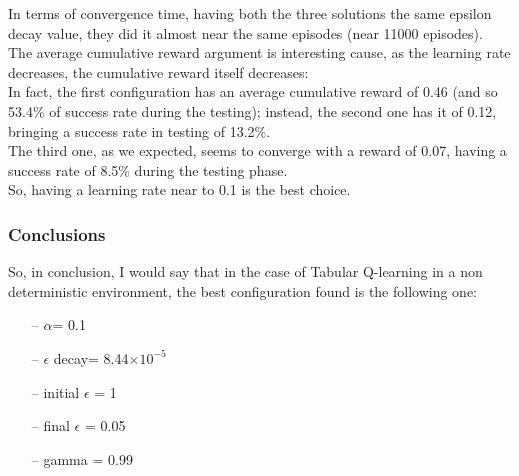 \documentclass{article}
\begin{document}
\begin{center}
\centering
{}
\end{center}

\clearpage

In terms of convergence time, having both the three solutions the same epsilon decay value, they did it almost near the same episodes (near 11000 episodes).
\\
The average cumulative reward argument is interesting cause, as the learning rate decreases, the cumulative reward itself decreases:
\\
In fact, the first configuration has an average cumulative reward of 0.46 (and so 53.4\% of success rate during the testing); instead, the second one has it of 0.12, bringing a success rate in testing of 13.2\%.
\\
The third one, as we expected, seems to converge with a reward of 0.07, having a success rate of 8.5\% during the testing phase.
\\
So, having a learning rate near to 0.1 is the best choice. 


\subsubsection{Conclusions}

So, in conclusion, I would say that in the case of Tabular Q-learning in a non deterministic environment, the best configuration found is the following one:


\begin{itemize}
\item[--] $\alpha$= 0.1
\item[--] $\epsilon$ decay= 8.44$\times10^{-5}$
\item[--] initial $\epsilon$ = 1
\item[--] final $\epsilon$ = 0.05
\item[--] gamma = 0.99
\end{itemize}
\end{document}
